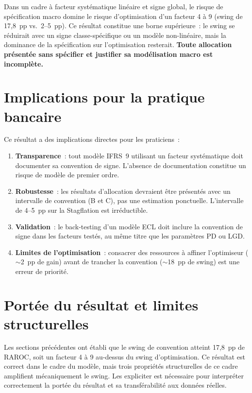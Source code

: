 \documentclass[12pt, a4paper, twoside, openright]{report}
\theoremstyle{definition}
\begin{document}
\begin{tcolorbox}[colback=bleutitre!5, colframe=bleutitre, title=\textbf{Résultat central}]
Dans un cadre à facteur systématique linéaire et signe global, le risque de spécification macro domine le risque d'optimisation d'un facteur 4 à 9 (swing de 17,8~pp vs.\ 2--5~pp). Ce résultat constitue une borne supérieure~: le swing se réduirait avec un signe classe-spécifique ou un modèle non-linéaire, mais la dominance de la spécification sur l'optimisation resterait. \textbf{Toute allocation présentée sans spécifier et justifier sa modélisation macro est incomplète.}
\end{tcolorbox}


\section{Implications pour la pratique bancaire}
\label{sec:conv-implications}

Ce résultat a des implications directes pour les praticiens~:

\begin{enumerate}
\item \textbf{Transparence}~: tout modèle IFRS~9 utilisant un facteur systématique doit documenter sa convention de signe. L'absence de documentation constitue un risque de modèle de premier ordre.
\item \textbf{Robustesse}~: les résultats d'allocation devraient être présentés avec un intervalle de convention (B et C), pas une estimation ponctuelle. L'intervalle de 4--5~pp sur la Stagflation est irréductible.
\item \textbf{Validation}~: le back-testing d'un modèle ECL doit inclure la convention de signe dans les facteurs testés, au même titre que les paramètres PD ou LGD.
\item \textbf{Limites de l'optimisation}~: consacrer des ressources à affiner l'optimiseur ($\sim$2~pp de gain) avant de trancher la convention ($\sim$18~pp de swing) est une erreur de priorité.
\end{enumerate}


\section{Portée du résultat et limites structurelles}
\label{sec:conv-portee}

Les sections précédentes ont établi que le swing de convention atteint 17,8~pp de RAROC, soit un facteur 4 à 9 au-dessus du swing d'optimisation. Ce résultat est correct dans le cadre du modèle, mais trois propriétés structurelles de ce cadre amplifient mécaniquement le swing. Les expliciter est nécessaire pour interpréter correctement la portée du résultat et sa transférabilité aux données réelles.
\end{document}

